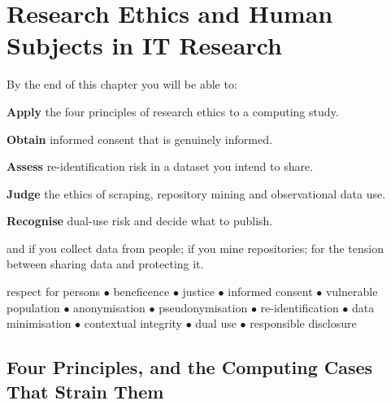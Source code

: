 \chapter{Research Ethics and Human Subjects in IT Research}\label{ch:ethics}

\begin{outcomes}
By the end of this chapter you will be able to:
\begin{tight}
  \item \textbf{Apply} the four principles of research ethics to a computing
    study.
  \item \textbf{Obtain} informed consent that is genuinely informed.
  \item \textbf{Assess} re-identification risk in a dataset you intend to
    share.
  \item \textbf{Judge} the ethics of scraping, repository mining and
    observational data use.
  \item \textbf{Recognise} dual-use risk and decide what to publish.
\end{tight}
\end{outcomes}

\begin{prereq}
 and  if you collect data from people;
 if you mine repositories;  for the
tension between sharing data and protecting it.
\end{prereq}

\begin{keyterms}
respect for persons $\bullet$ beneficence $\bullet$ justice $\bullet$
informed consent $\bullet$ vulnerable population $\bullet$ anonymisation
$\bullet$ pseudonymisation $\bullet$ re-identification $\bullet$ data
minimisation $\bullet$ contextual integrity $\bullet$ dual use $\bullet$
responsible disclosure
\end{keyterms}

\section{Four Principles, and the Computing Cases That Strain Them}

